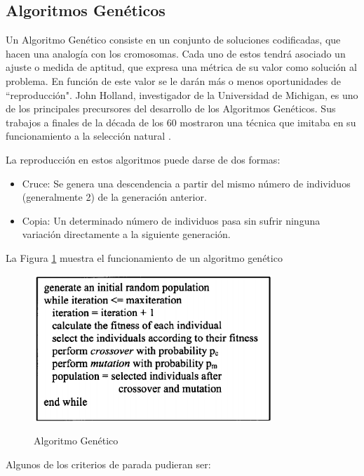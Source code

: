 \documentclass[a4paper,openright,11pt,oneside]{book}
\begin{document}
	\subsection{Algoritmos Genéticos} \label{sub:Genetico}
		Un Algoritmo Genético \cite{AlgGen} consiste en un conjunto de soluciones codificadas, que hacen una analogía con los cromosomas.  Cada uno  de  estos tendrá asociado un ajuste o medida de aptitud, que expresa una métrica de su valor como solución al problema. En función de este valor se le darán más o menos oportunidades de ``reproducción". John Holland, investigador de la Universidad de Michigan, es uno de los principales precursores del desarrollo de los Algoritmos Genéticos. Sus trabajos a finales de la década de los 60 mostraron una técnica que imitaba en su funcionamiento a la selección natural \cite{melian2009algoritmos}.
		
		La reproducción en estos algoritmos puede darse de dos formas:
		
		\begin{itemize}
			\item Cruce: Se genera una descendencia a partir del mismo número de individuos (generalmente 2) de la generación anterior. 
			\item Copia: Un determinado número de individuos pasa sin sufrir ninguna variación directamente a la siguiente generación.
		\end{itemize}
	
		La Figura \ref{AlgoritmoeGenetico} muestra el funcionamiento de un algoritmo genético
	
		\begin{figure}[h]
			\centering
			\includegraphics[width=9cm]{./Graphics/Genetic-Algorithm-pseudocode.png}
			\caption{Algoritmo Genético}
			\label{AlgoritmoeGenetico} \cite{ferentinos2002heuristic}
		\end{figure}
	
		Algunos de los criterios de parada pudieran ser:
		
\end{document}
